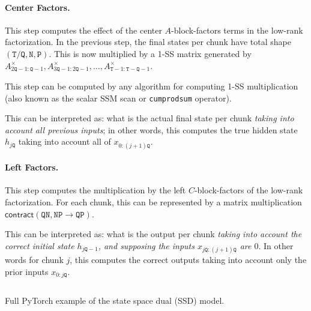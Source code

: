 \paragraph{Center Factors.}

This step computes the effect of the center $A$-block-factors terms in the low-rank factorization.
In the previous step, the final states per chunk have total shape $\mathtt{(\mathtt{T}/\mathtt{Q},\mathtt{N},\mathtt{P})}$.
This is now multiplied by a 1-SS matrix generated by $A_{2\mathtt{Q}-1:\mathtt{Q}-1}^\times, A_{3\mathtt{Q}-1:2\mathtt{Q}-1}^\times, \dots, A_{\mathtt{T}-1:\mathtt{T}-\mathtt{Q}-1}^\times$.

This step can be computed by any algorithm for computing 1-SS multiplication (also known as the scalar SSM scan or \texttt{cumprodsum} operator).

This can be interpreted as: what is the actual final state per chunk \emph{taking into account all previous inputs};
in other words, this computes the true hidden state $h_{j\mathtt{Q}}$ taking into account all of $x_{0:(j+1)\mathtt{Q}}$.

\paragraph{Left Factors.}

This step computes the multiplication by the left $C$-block-factors of the low-rank factorization.
For each chunk, this can be represented by a matrix multiplication
$\mathsf{contract}(\mathtt{QN,NP \to QP})$.

This can be interpreted as: what is the output per chunk \emph{taking into account the correct initial state $h_{j\mathtt{Q}-1}$, and supposing the inputs $x_{j\mathtt{Q}:(j+1)\mathtt{Q}}$ are $0$}.
In other words for chunk $j$, this computes the correct outputs taking into account only the prior inputs $x_{0:j\mathtt{Q}}$.

\begin{listing*}[!t]
\inputminted[fontsize=\footnotesize]{python}{structure/code.py}
\caption{Full PyTorch example of the state space dual (SSD) model.}
\label{listing}
\end{listing*}


